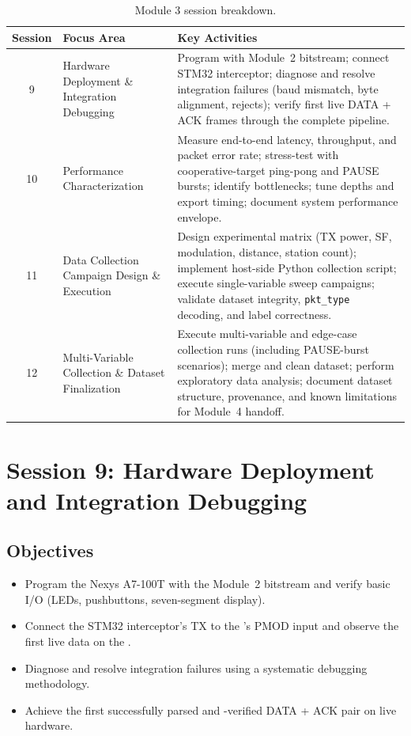 \documentclass[11pt,letterpaper]{article}
\begin{document}
	\begin{table}[ht!]
		\centering
		\caption{Module 3 session breakdown.}
		\label{tab:schedule}
		\renewcommand{\arraystretch}{1.4}
		\begin{tabularx}{\textwidth}{c l X}
			\toprule
			\textbf{Session} & \textbf{Focus Area} & \textbf{Key Activities} \\
			\midrule
			9 & Hardware Deployment \& Integration Debugging &
			Program \FPGA{} with Module~2 bitstream; connect STM32 interceptor; diagnose and resolve integration failures (baud mismatch, byte alignment, \CRC{} rejects); verify first live DATA + ACK frames through the complete pipeline. \\
			10 & Performance Characterization &
			Measure end-to-end latency, throughput, and packet error rate; stress-test with cooperative-target ping-pong and PAUSE bursts; identify bottlenecks; tune \FIFO{} depths and export timing; document system performance envelope. \\
			11 & Data Collection Campaign Design \& Execution &
			Design experimental matrix (TX power, SF, modulation, distance, station count); implement host-side Python collection script; execute single-variable sweep campaigns; validate dataset integrity, \texttt{pkt\_type} decoding, and label correctness. \\
			12 & Multi-Variable Collection \& Dataset Finalization &
			Execute multi-variable and edge-case collection runs (including PAUSE-burst scenarios); merge and clean dataset; perform exploratory data analysis; document dataset structure, provenance, and known limitations for Module~4 handoff. \\
			\bottomrule
		\end{tabularx}
	\end{table}

	\newpage
	\section{Session 9: Hardware Deployment and Integration Debugging}
	\label{sec:integration}

	\subsection{Objectives}

	\begin{itemize}[leftmargin=2em]
		\item Program the Nexys A7-100T with the Module~2 bitstream and verify basic I/O (LEDs, pushbuttons, seven-segment display).
		\item Connect the STM32 interceptor's \UART{} TX to the \FPGA{}'s PMOD input and observe the first live data on the \FPGA{}.
		\item Diagnose and resolve integration failures using a systematic debugging methodology.
		\item Achieve the first successfully parsed and \CRC{}-verified DATA + ACK pair on live hardware.
	\end{itemize}
\end{document}
